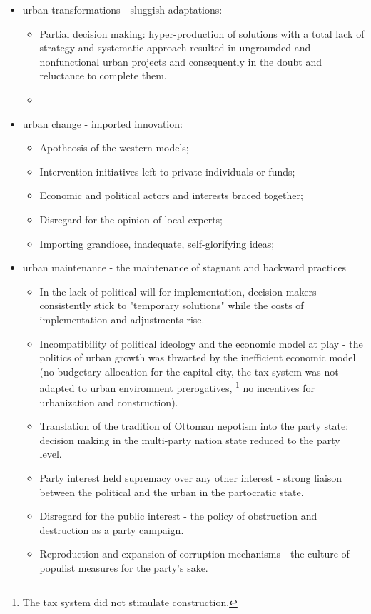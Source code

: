 \documentclass[11pt]{report}
\begin{document}
\begin{itemize}
\item urban transformations - sluggish adaptations:
\\
\begin{itemize}
\item Partial decision making: hyper-production of solutions with  a total lack of strategy and systematic approach resulted in ungrounded and nonfunctional urban projects and consequently in the doubt and reluctance to complete them.
\item 
\end{itemize}

\item urban change - imported innovation:
\begin{itemize}
\item Apotheosis of the western models;
\item Intervention initiatives left to private individuals or funds; 
\item Economic and political actors and interests braced together;
\item Disregard for the opinion of local experts;
\item Importing grandiose, inadequate, self-glorifying ideas; %
\end{itemize}

\item urban maintenance - the maintenance of stagnant and backward practices
\\
\begin{itemize}
\item In the lack of political will for implementation, decision-makers consistently stick to "temporary solutions" while the costs of implementation and adjustments rise.
\item Incompatibility of political ideology and the economic model at play - the politics of urban growth was thwarted by the inefficient economic model (no budgetary allocation for the capital city,
the tax system was not adapted to urban environment prerogatives,
\footnote{The tax system did not stimulate construction.}
no incentives for urbanization and construction).
\item Translation of the tradition of Ottoman nepotism into the party state: decision making in the multi-party nation state reduced to the party level.
\item Party interest held supremacy over any other interest - strong liaison between the political and the urban in the partocratic state.
\item Disregard for the public interest - the policy of obstruction and destruction as a party campaign.
\item Reproduction and expansion of corruption mechanisms - the culture of populist measures for the party's sake. 
\end{itemize}
\end{itemize}
\end{document}
